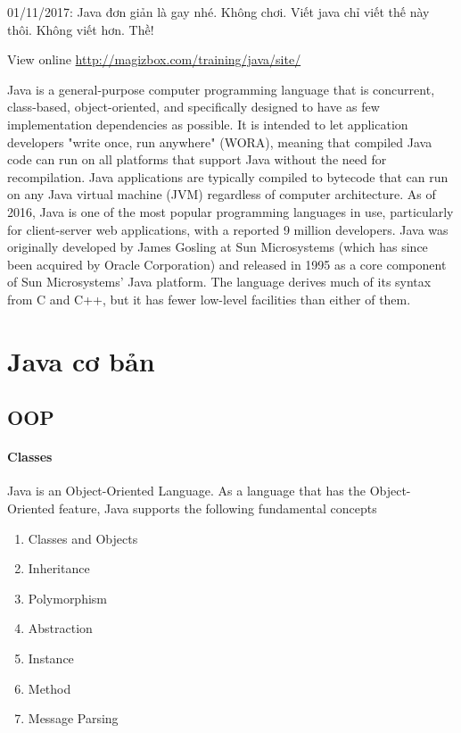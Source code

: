 01/11/2017: Java đơn giản là gay nhé. Không chơi. Viết java chỉ viết thế này thôi. Không viết hơn. Thề!

View online \href{http://magizbox.com/training/java/site/}{http://magizbox.com/training/java/site/}

Java is a general-purpose computer programming language that is concurrent, class-based, object-oriented, and specifically designed to have as few implementation dependencies as possible. It is intended to let application developers "write once, run anywhere" (WORA), meaning that compiled Java code can run on all platforms that support Java without the need for recompilation. Java applications are typically compiled to bytecode that can run on any Java virtual machine (JVM) regardless of computer architecture. As of 2016, Java is one of the most popular programming languages in use, particularly for client-server web applications, with a reported 9 million developers. Java was originally developed by James Gosling at Sun Microsystems (which has since been acquired by Oracle Corporation) and released in 1995 as a core component of Sun Microsystems' Java platform. The language derives much of its syntax from C and C++, but it has fewer low-level facilities than either of them.


\part{Java cơ bản}






\chapter{OOP}

\subsection{Classes}

Java is an Object-Oriented Language. As a language that has the Object-Oriented feature, Java supports the following fundamental concepts

\begin{enumerate}
  \item Classes and Objects
  \item Inheritance
  \item Polymorphism
  \item Abstraction
  \item Instance
  \item Method
  \item Message Parsing
\end{enumerate}



